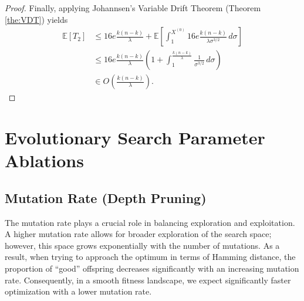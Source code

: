 \begin{proof}
    Finally, applying Johannsen's Variable Drift Theorem \citep{johannsen_phd_thesis} (Theorem \ref{the:VDT}) yields
    \begin{align*}
    \mathbb{E}[T_2] &\leq  16e \frac{k(n-k)}{\lambda} + \mathbb{E}\left[\int_1^{X^{(0)}} 16e \frac{k(n-k)}{\lambda \sigma^{3/2}} \, d\sigma \right] \\
    &\leq 16e \frac{k(n-k)}{\lambda} \left( 1 + \int_1^{\frac{k(n-k)}{\lambda}} \frac{1}{\sigma^{3/2}} \, d\sigma \right) \\
    &\in O\left(\frac{k(n-k)}{\lambda}\right).
\end{align*}

\end{proof}

\section{Evolutionary Search Parameter Ablations}
\label{app:evo_search_ablations}
\subsection{Mutation Rate (Depth Pruning)}
\label{app:evo_search_ablations_dropping}

The mutation rate plays a crucial role in balancing exploration and exploitation. A higher mutation rate allows for broader exploration of the search space; however, this space grows exponentially with the number of mutations. As a result, when trying to approach the optimum in terms of Hamming distance, the proportion of ``good'' offspring decreases significantly with an increasing mutation rate. Consequently, in a smooth fitness landscape, we expect significantly faster optimization with a lower mutation rate.

